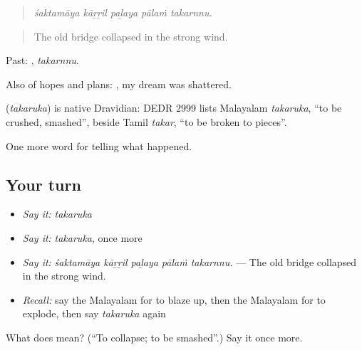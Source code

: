 \begin{quote}
\emph{śaktamāya kāṟṟil paḻaya pālaṁ takarnnu.}
\end{quote}

\begin{quote}
The old bridge collapsed in the strong wind.
\end{quote}

Past: , \emph{takarnnu}.

Also of hopes and plans:   , my dream was shattered.

\begin{cousinweb}
\textbf{} (\emph{takaruka}) is native Dravidian: DEDR 2999 lists Malayalam \emph{takaruka}, \textquotedblleft{}to be crushed, smashed\textquotedblright{}, beside Tamil \emph{takar}, \textquotedblleft{}to be broken to pieces\textquotedblright{}.
\end{cousinweb}

\begin{grammarlens}[title={What you've built}]
One more word for telling what happened.
\end{grammarlens}

\subsection*{Your turn}
\begin{itemize}
\raggedright
  \item \emph{Say it:} \emph{takaruka}
  \item \emph{Say it:} \emph{takaruka}, once more
  \item \emph{Say it:} \emph{śaktamāya kāṟṟil paḻaya pālaṁ takarnnu.} — The old bridge collapsed in the strong wind.
  \item \emph{Recall:} say the Malayalam for to blaze up, then the Malayalam for to explode, then say \emph{takaruka} again
\end{itemize}

\begin{tcolorbox}[breakable,colback=teal!4,colframe=teal!35!black,title={Before you move on}]
What does  mean? (\textquotedblleft{}To collapse; to be smashed\textquotedblright{}.) Say it once more.
\end{tcolorbox}
